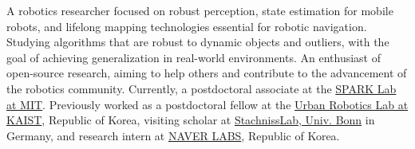 

\begin{cvparagraph}

A robotics researcher focused on robust perception, state estimation for mobile robots, and lifelong mapping technologies essential for robotic navigation.
Studying algorithms that are robust to dynamic objects and outliers, with the goal of achieving generalization in real-world environments.
An enthusiast of open-source research, aiming to help others and contribute to the advancement of the robotics community.
Currently, a postdoctoral associate at the \href{https://web.mit.edu/sparklab/people.html}{SPARK Lab at MIT}.
Previously worked as a postdoctoral fellow at the \href{https://urobot.kaist.ac.kr/}{Urban Robotics Lab at KAIST}, Republic of Korea,
visiting scholar at \href{https://www.ipb.uni-bonn.de/}{StachnissLab, Univ. Bonn} in Germany, and research intern at \href{https://www.naverlabs.com/}{NAVER LABS}, Republic of Korea.
\end{cvparagraph}

\newcommand{\lineintv}{\vspace{0.0cm}} %

